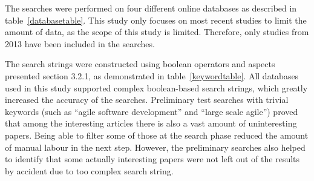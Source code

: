 The searches were performed on four different online databases as
described in table~\ref{databasetable}. This study only focuses on most recent studies to limit
the amount of data, as the scope of this study is limited. Therefore, only
studies from 2013 have been included in the searches.

\bigskip

\bigskip

The search strings were constructed using boolean operators and aspects
presented section 3.2.1, as demonstrated in table~\ref{keywordtable}\@. All databases
used in this study supported complex boolean-based search strings,
which greatly increased the accuracy of the searches. Preliminary test
searches with trivial keywords (such as ``agile software development'' and
``large scale agile'') proved that among the interesting articles there is
also a vast amount of uninteresting papers. Being able to filter some
of those at the search phase reduced the amount of manual labour in the
next step. However, the preliminary searches also helped to identify
that some actually interesting papers were not left out of the results
by accident due to too complex search string.

\bigskip
{
}
\medskip
